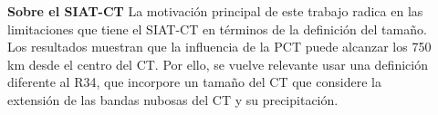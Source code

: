 \begin{frame}
\begin{columns}
    \begin{column}{0.5\textwidth}
        \begin{block}{\textbf{Sobre el SIAT-CT}}
        La motivación principal de este trabajo radica en las limitaciones que tiene el SIAT-CT en términos de la definición del tamaño. Los resultados muestran que la influencia de la PCT puede alcanzar los 750 km desde el centro del CT. Por ello, se vuelve relevante usar una definición diferente al R34, que incorpore un tamaño del CT que considere la extensión de las bandas nubosas del CT y su precipitación.
        \end{block}
    \end{column}
    \begin{column}{0.5\textwidth}
    \begin{figure}
        \centering

\end{figure}
\end{column}
\end{columns}
\end{frame}
